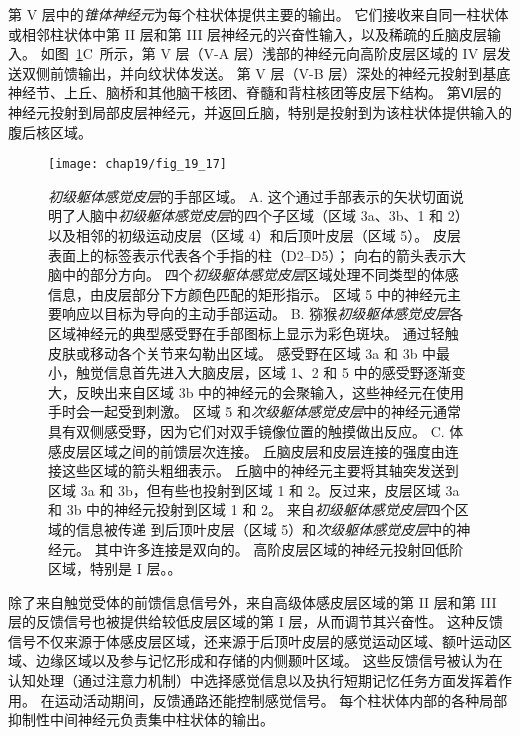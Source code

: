 第 V 层中的\textit{锥体神经元}为每个柱状体提供主要的输出。
它们接收来自同一柱状体或相邻柱状体中第 II 层和第 III 层神经元的兴奋性输入，以及稀疏的丘脑皮层输入。
如图~\ref{fig:19_17}C~所示，第 V 层（V-A 层）浅部的神经元向高阶皮层区域的 IV 层发送双侧前馈输出，并向纹状体发送。
第 V 层（V-B 层）深处的神经元投射到基底神经节、上丘、脑桥和其他脑干核团、脊髓和背柱核团等皮层下结构。
第Ⅵ层的神经元投射到局部皮层神经元，并返回丘脑，特别是投射到为该柱状体提供输入的腹后核区域。


\begin{figure}[htbp]
	\centering
	\texttt{[image: chap19/fig\_19\_17]}
	\caption{\textit{初级躯体感觉皮层}的手部区域。 
		A. 这个通过手部表示的矢状切面说明了人脑中\textit{初级躯体感觉皮层}的四个子区域（区域 3a、3b、1 和 2）以及相邻的初级运动皮层（区域 4）和后顶叶皮层（区域 5）。
		皮层表面上的标签表示代表各个手指的柱（D2–D5）；
		向右的箭头表示大脑中的部分方向。
		四个\textit{初级躯体感觉皮层}区域处理不同类型的体感信息，由皮层部分下方颜色匹配的矩形指示。
		区域 5 中的神经元主要响应以目标为导向的主动手部运动。
		B. 猕猴\textit{初级躯体感觉皮层}各区域神经元的典型感受野在手部图标上显示为彩色斑块。
		通过轻触皮肤或移动各个关节来勾勒出区域。
		感受野在区域 3a 和 3b 中最小，触觉信息首先进入大脑皮层，区域 1、2 和 5 中的感受野逐渐变大，反映出来自区域 3b 中的神经元的会聚输入，这些神经元在使用手时会一起受到刺激。
		区域 5 和\textit{次级躯体感觉皮层}中的神经元通常具有双侧感受野，因为它们对双手镜像位置的触摸做出反应\cite{gardner1988somatosensory,iwamura1993rostrocaudal,iwamura1994bilateral}。
		C. 体感皮层区域之间的前馈层次连接。
		丘脑皮层和皮层连接的强度由连接这些区域的箭头粗细表示。
		丘脑中的神经元主要将其轴突发送到区域 3a 和 3b，但有些也投射到区域 1 和 2。反过来，皮层区域 3a 和 3b 中的神经元投射到区域 1 和 2。
		来自\textit{初级躯体感觉皮层}四个区域的信息被传递 到后顶叶皮层（区域 5）和\textit{次级躯体感觉皮层}中的神经元。
		其中许多连接是双向的。
		高阶皮层区域的神经元投射回低阶区域，特别是 I 层。\cite{felleman1991distributed}。}
	\label{fig:19_17}
\end{figure}


除了来自触觉受体的前馈信息信号外，来自高级体感皮层区域的第 II 层和第 III 层的反馈信号也被提供给较低皮层区域的第 I 层，从而调节其兴奋性。
这种反馈信号不仅来源于体感皮层区域，还来源于后顶叶皮层的感觉运动区域、额叶运动区域、边缘区域以及参与记忆形成和存储的内侧颞叶区域。
这些反馈信号被认为在认知处理（通过注意力机制）中选择感觉信息以及执行短期记忆任务方面发挥着作用。
在运动活动期间，反馈通路还能控制感觉信号。
每个柱状体内部的各种局部抑制性中间神经元负责集中柱状体的输出。



